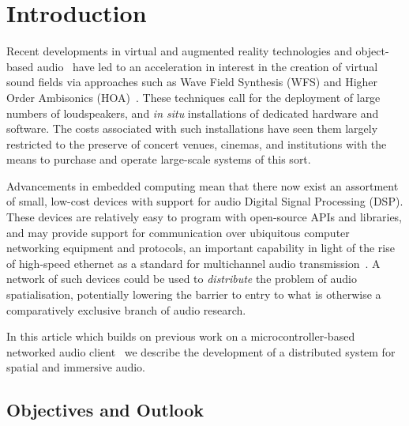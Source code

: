 \section{Introduction}\label{sec:introduction}

Recent developments in virtual and augmented reality technologies and
object-based audio~\citep{geier_object-based_2010} have led to an acceleration
in interest in the creation of virtual sound fields via approaches such as Wave
Field Synthesis (WFS) and Higher Order Ambisonics
(HOA)~\citep{berkhout_acoustic_1993,ahrens_theory_2008,daniel_further_2003,
    frank_producing_2015}.
These techniques call for the deployment of large numbers of loudspeakers, and
\textit{in situ} installations of dedicated hardware and software.
The costs associated with such installations have seen them largely restricted
to the preserve of concert venues, cinemas, and institutions with the means to
purchase and operate large-scale systems of this sort.

Advancements in embedded computing mean that there now exist an assortment of
small, low-cost devices with support for audio Digital Signal Processing (DSP).
These devices are relatively easy to program with open-source APIs and
libraries, and may provide support for communication over ubiquitous computer
networking equipment and protocols, an important capability in light of the
rise of high-speed ethernet as a standard for multichannel audio
transmission~\citep{bakker_introduction_2014}.
A network of such devices could be used to \textit{distribute} the problem of
audio spatialisation, potentially lowering the barrier to entry to what is
otherwise a comparatively exclusive branch of audio research.

In this article \textemdash{} which builds on previous work on a
microcontroller-based networked audio
client~\citep{rushton_microcontroller-based_2023} \textemdash{} we describe the
development of a distributed system for spatial and immersive audio.






\subsection{Objectives and Outlook}\label{subsec:objectives}

